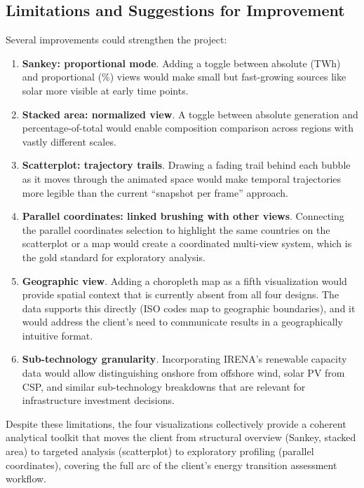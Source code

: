 \documentclass[10pt]{article}
\begin{document}
\subsection{Limitations and Suggestions for Improvement}

Several improvements could strengthen the project:

\begin{enumerate}
    \item \textbf{Sankey: proportional mode}. Adding a toggle between absolute (TWh) and proportional (\%) views would make small but fast-growing sources like solar more visible at early time points.

    \item \textbf{Stacked area: normalized view}. A toggle between absolute generation and percentage-of-total would enable composition comparison across regions with vastly different scales.

    \item \textbf{Scatterplot: trajectory trails}. Drawing a fading trail behind each bubble as it moves through the animated space would make temporal trajectories more legible than the current ``snapshot per frame'' approach.

    \item \textbf{Parallel coordinates: linked brushing with other views}. Connecting the parallel coordinates selection to highlight the same countries on the scatterplot or a map would create a coordinated multi-view system, which is the gold standard for exploratory analysis.

    \item \textbf{Geographic view}. Adding a choropleth map as a fifth visualization would provide spatial context that is currently absent from all four designs. The data supports this directly (ISO codes map to geographic boundaries), and it would address the client's need to communicate results in a geographically intuitive format.

    \item \textbf{Sub-technology granularity}. Incorporating IRENA's renewable capacity data would allow distinguishing onshore from offshore wind, solar PV from CSP, and similar sub-technology breakdowns that are relevant for infrastructure investment decisions.
\end{enumerate}

Despite these limitations, the four visualizations collectively provide a coherent analytical toolkit that moves the client from structural overview (Sankey, stacked area) to targeted analysis (scatterplot) to exploratory profiling (parallel coordinates), covering the full arc of the client's energy transition assessment workflow.
\end{document}
